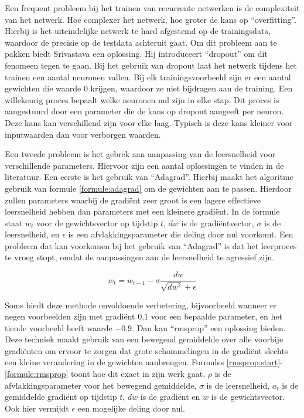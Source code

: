 Een frequent probleem bij het trainen van recurrente netwerken is de complexiteit van het netwerk. Hoe complexer het netwerk, hoe groter de kans op ``overfitting''. Hierbij is het uiteindelijke netwerk te hard afgestemd op de trainingsdata, waardoor de precisie op de testdata achteruit gaat. Om dit probleem aan te pakken biedt Srivastava\cite{Srivastava2014} een oplossing. Hij introduceert ``dropout'' om dit fenomeen tegen te gaan. Bij het gebruik van dropout laat het netwerk tijdens het trainen een aantal neuronen vallen. Bij elk trainingsvoorbeeld zijn er een aantal gewichten die waarde 0 krijgen, waardoor ze niet bijdragen aan de training. Een willekeurig proces bepaalt welke neuronen nul zijn in elke stap. Dit proces is aangestuurd door een parameter die de kans op dropout aangeeft per neuron. Deze  kans kan verschillend zijn voor elke laag. Typisch is deze kans kleiner voor inputwaarden dan voor verborgen waarden.

Een tweede probleem is het gebrek aan aanpassing van de leersnelheid voor verschillende parameters. Hiervoor zijn een aantal oplossingen te vinden in de literatuur. Een eerste is het gebruik van ``Adagrad''\cite{Duchi2011}. Hierbij maakt het algoritme gebruik van formule \eqref{formule:adagrad} om de gewichten aan te passen. Hierdoor zullen parameters waarbij de gradi\"ent zeer groot is een lagere effectieve leersnelheid hebben dan parameters met een kleinere gradi\"ent. In de formule staat $w_t$ voor de gewichtsvector op tijdstip $t$, $dw$ is de gradi\"entvector, $\sigma$ is de leersnelheid, en $\epsilon$ is een afvlakkingsparameter die deling door nul voorkomt. Een probleem dat kan voorkomen bij het gebruik van ``Adagrad'' is dat het leerproces te vroeg stopt, omdat de aanpassingen aan de leersnelheid te agressief zijn.
 
\begin{equation}
    w_t = w_{t-1} - \sigma \frac{dw}{\sqrt{dw^2} + \epsilon}
    \label{formule:adagrad}
\end{equation}

Soms biedt deze methode onvoldoende verbetering, bijvoorbeeld wanneer er negen voorbeelden zijn met gradi\"ent $0.1$ voor een bepaalde parameter, en het tiende voorbeeld heeft waarde $-0.9$. Dan kan ``rmsprop''\cite{RMSprop} een oplossing bieden. Deze techniek maakt gebruik van een bewegend gemiddelde over alle voorbije gradi\"enten om ervoor te zorgen dat grote schommelingen in de gradi\"ent slechts een kleine verandering in de gewichten aanbrengen. Formules \eqref{rmsprop:start}-\eqref{formule:rmsprop} toont hoe dit exact in zijn werk gaat. $\rho$ is de afvlakkingsparameter voor het bewegend gemiddelde, $\sigma$ is de leersnelheid, $a_t$ is de gemiddelde gradi\"ent op tijdstip $t$, $dw$ is de gradi\"ent en $w$ is de gewichtsvector. Ook hier vermijdt $\epsilon$ een mogelijke deling door nul.

